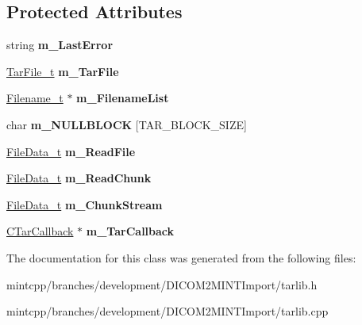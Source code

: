 \subsection*{Protected Attributes}
\begin{DoxyCompactItemize}
\item 
\hypertarget{class_c_tar_aee92304fb92ad16dfce088332372e219}{
string {\bfseries m\_\-LastError}}
\label{class_c_tar_aee92304fb92ad16dfce088332372e219}

\item 
\hypertarget{class_c_tar_abd6210a19feecf391b4c03dcd1755833}{
\hyperlink{struct_tar_file}{TarFile\_\-t} {\bfseries m\_\-TarFile}}
\label{class_c_tar_abd6210a19feecf391b4c03dcd1755833}

\item 
\hypertarget{class_c_tar_a4799b2d092e461a2020404e1ea5e0ec3}{
\hyperlink{struct_filename}{Filename\_\-t} $\ast$ {\bfseries m\_\-FilenameList}}
\label{class_c_tar_a4799b2d092e461a2020404e1ea5e0ec3}

\item 
\hypertarget{class_c_tar_a5f3b8169d18e59040f828afeb66c38a9}{
char {\bfseries m\_\-NULLBLOCK} \mbox{[}TAR\_\-BLOCK\_\-SIZE\mbox{]}}
\label{class_c_tar_a5f3b8169d18e59040f828afeb66c38a9}

\item 
\hypertarget{class_c_tar_afe7211f96f921270d87ff42116e9859a}{
\hyperlink{struct_file_data}{FileData\_\-t} {\bfseries m\_\-ReadFile}}
\label{class_c_tar_afe7211f96f921270d87ff42116e9859a}

\item 
\hypertarget{class_c_tar_aada26e7040056ff06dfbfed44795ad6e}{
\hyperlink{struct_file_data}{FileData\_\-t} {\bfseries m\_\-ReadChunk}}
\label{class_c_tar_aada26e7040056ff06dfbfed44795ad6e}

\item 
\hypertarget{class_c_tar_a2f7cb844486b63929ebde21cb216a575}{
\hyperlink{struct_file_data}{FileData\_\-t} {\bfseries m\_\-ChunkStream}}
\label{class_c_tar_a2f7cb844486b63929ebde21cb216a575}

\item 
\hypertarget{class_c_tar_a0a927560663b50a70d9d9d0fbcdc82b8}{
\hyperlink{class_c_tar_callback}{CTarCallback} $\ast$ {\bfseries m\_\-TarCallback}}
\label{class_c_tar_a0a927560663b50a70d9d9d0fbcdc82b8}

\end{DoxyCompactItemize}


The documentation for this class was generated from the following files:\begin{DoxyCompactItemize}
\item 
mintcpp/branches/development/DICOM2MINTImport/tarlib.h\item 
mintcpp/branches/development/DICOM2MINTImport/tarlib.cpp\end{DoxyCompactItemize}
